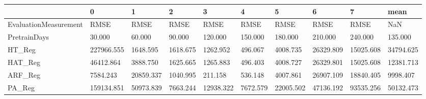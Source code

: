 \begin{tabular}{llllllllll}
\toprule
{} &          0 &         1 &        2 &         3 &        4 &         5 &         6 &         7 &      mean \\
\midrule
EvaluationMeasurement &       RMSE &      RMSE &     RMSE &      RMSE &     RMSE &      RMSE &      RMSE &      RMSE &       NaN \\
PretrainDays          &     30.000 &    60.000 &   90.000 &   120.000 &  150.000 &   180.000 &   210.000 &   240.000 &   135.000 \\
HT\_Reg                & 227966.555 &  1648.595 & 1618.675 &  1262.952 &  496.067 &  4008.735 & 26329.809 & 15025.608 & 34794.625 \\
HAT\_Reg               &  46412.864 &  3888.750 & 1625.665 &  1265.883 &  496.403 &  4008.727 & 26329.801 & 15025.608 & 12381.713 \\
ARF\_Reg               &   7584.243 & 20859.337 & 1040.995 &   211.158 &  536.148 &  4007.861 & 26907.109 & 18840.405 &  9998.407 \\
PA\_Reg                & 159134.851 & 50973.839 & 7663.244 & 12938.322 & 7672.579 & 22005.502 & 47136.192 & 93535.256 & 50132.473 \\
\bottomrule
\end{tabular}
